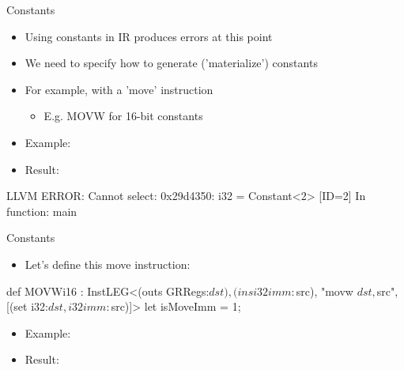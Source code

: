 \begin{frame}[fragile]{Constants}

\begin{itemize}
    \item Using constants in IR produces errors at this point
    \item We need to specify how to generate ('materialize') constants
    \item For example, with a 'move' instruction
    \begin{itemize}
        \item E.g. MOVW for 16-bit constants
    \end{itemize}
\end{itemize}

\begin{itemize}
    \item Example:
\end{itemize}

\begin{itemize}
    \item Result:
\end{itemize}
\begin{codebox}
LLVM ERROR: Cannot select: 0x29d4350: i32 = Constant<2> [ID=2]
In function: main
\end{codebox}

\end{frame}


\begin{frame}[fragile]{Constants}

\begin{itemize}
    \item Let's define this move instruction:
\end{itemize}

\begin{codebox}
def MOVWi16 : InstLEG<(outs GRRegs:$dst),
                      (ins i32imm:$src),
                      "movw $dst, $src",
                      [(set i32:$dst, i32imm:$src)]> {
  let isMoveImm = 1;
}
\end{codebox}

\begin{itemize}
    \item Example:
\end{itemize}

\begin{itemize}
    \item Result:
\end{itemize}

\end{frame}

